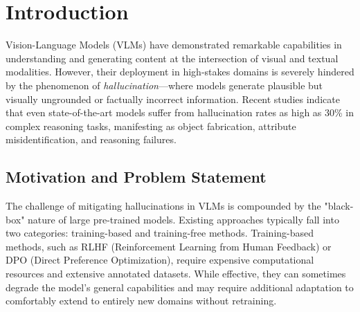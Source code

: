 \providecommand{\revised}[1]{{\color{blue}#1}}
\section{Introduction}
\label{sec:introduction}

Vision-Language Models (VLMs) have demonstrated remarkable capabilities in understanding and generating content at the intersection of visual and textual modalities. However, their deployment in high-stakes domains is severely hindered by the phenomenon of \textit{hallucination}—where models generate plausible but visually ungrounded or factually incorrect information. Recent studies indicate that even state-of-the-art models suffer from hallucination rates as high as 30\% in complex reasoning tasks, manifesting as object fabrication, attribute misidentification, and reasoning failures.

\subsection{Motivation and Problem Statement}
The challenge of mitigating hallucinations in VLMs is compounded by the "black-box" nature of large pre-trained models. Existing approaches typically fall into two categories: training-based and training-free methods. Training-based methods, such as RLHF (Reinforcement Learning from Human Feedback) or DPO (Direct Preference Optimization), require expensive computational resources and extensive annotated datasets. While effective, they can sometimes degrade the model's general capabilities and may require additional adaptation to comfortably extend to entirely new domains without retraining.

